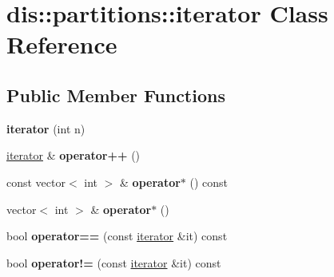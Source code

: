 \hypertarget{classdis_1_1partitions_1_1iterator}{\section{dis\-:\-:partitions\-:\-:iterator Class Reference}
\label{classdis_1_1partitions_1_1iterator}
}
\subsection*{Public Member Functions}
\begin{DoxyCompactItemize}
\item 
\hypertarget{classdis_1_1partitions_1_1iterator_aeec4f46c57d15cedb68ed401ecaed4b1}{{\bfseries iterator} (int n)}\label{classdis_1_1partitions_1_1iterator_aeec4f46c57d15cedb68ed401ecaed4b1}

\item 
\hypertarget{classdis_1_1partitions_1_1iterator_a83149437fa27f1cd8aab0169f03a3ea6}{\hyperlink{classdis_1_1partitions_1_1iterator}{iterator} \& {\bfseries operator++} ()}\label{classdis_1_1partitions_1_1iterator_a83149437fa27f1cd8aab0169f03a3ea6}

\item 
\hypertarget{classdis_1_1partitions_1_1iterator_af75e7a687d74956786c158385f66ad15}{const vector$<$ int $>$ \& {\bfseries operator$\ast$} () const }\label{classdis_1_1partitions_1_1iterator_af75e7a687d74956786c158385f66ad15}

\item 
\hypertarget{classdis_1_1partitions_1_1iterator_af812fe502bbbfbc26a3f0c3f28eb40c1}{vector$<$ int $>$ \& {\bfseries operator$\ast$} ()}\label{classdis_1_1partitions_1_1iterator_af812fe502bbbfbc26a3f0c3f28eb40c1}

\item 
\hypertarget{classdis_1_1partitions_1_1iterator_a26867ae1966fafce6c71dfb880ce357d}{bool {\bfseries operator==} (const \hyperlink{classdis_1_1partitions_1_1iterator}{iterator} \&it) const }\label{classdis_1_1partitions_1_1iterator_a26867ae1966fafce6c71dfb880ce357d}

\item 
\hypertarget{classdis_1_1partitions_1_1iterator_a8c5f7c54ed3130264a950f661c6b28ab}{bool {\bfseries operator!=} (const \hyperlink{classdis_1_1partitions_1_1iterator}{iterator} \&it) const }\label{classdis_1_1partitions_1_1iterator_a8c5f7c54ed3130264a950f661c6b28ab}

\end{DoxyCompactItemize}
